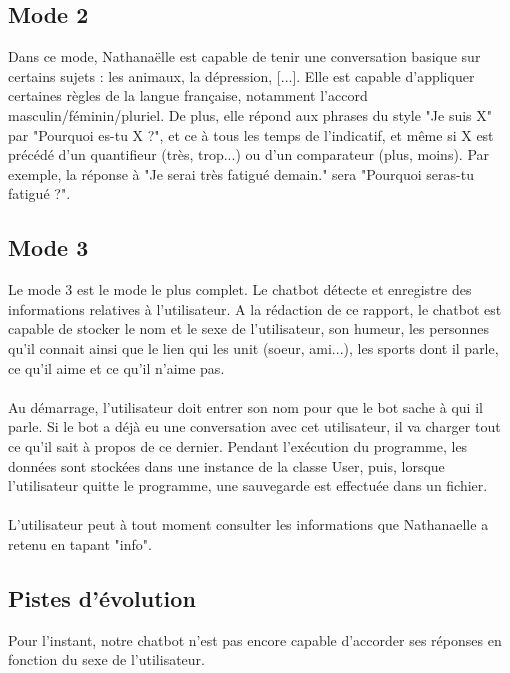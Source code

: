 \documentclass[paper=a4, fontsize=11pt]{article}
\begin{document}
\subsection{Mode 2}

Dans ce mode, Nathanaëlle est capable de tenir une conversation basique sur certains sujets : les animaux, la dépression, [...]. Elle est capable d'appliquer certaines règles de la langue française, notamment l'accord masculin/féminin/pluriel. De plus, elle répond aux phrases du style "Je suis X" par "Pourquoi es-tu X ?", et ce à tous les temps de l'indicatif, et même si X est précédé d'un quantifieur (très, trop...) ou d'un comparateur (plus, moins). Par exemple, la réponse à "Je serai très fatigué demain." sera "Pourquoi seras-tu fatigué ?".

\subsection{Mode 3}

Le mode 3 est le mode le plus complet. Le chatbot détecte et enregistre des informations relatives à l'utilisateur. A la rédaction de ce rapport, le chatbot est capable de stocker le nom et le sexe de l'utilisateur, son humeur, les personnes qu'il connait ainsi que le lien qui les unit (soeur, ami...), les sports dont il parle, ce qu'il aime et ce qu'il n'aime pas.
\paragraph{} Au démarrage, l'utilisateur doit entrer son nom pour que le bot sache à qui il parle. Si le bot a déjà eu une conversation avec cet utilisateur, il va charger tout ce qu'il sait à propos de ce dernier. Pendant l'exécution du programme, les données sont stockées dans une instance de la classe User, puis, lorsque l'utilisateur quitte le programme, une sauvegarde est effectuée dans un fichier.
\paragraph{} L'utilisateur peut à tout moment consulter les informations que Nathanaelle a retenu en tapant "info".

\subsection{Pistes d'évolution}

Pour l'instant, notre chatbot n'est pas encore capable d'accorder ses réponses en fonction du sexe de l'utilisateur.
\end{document}

